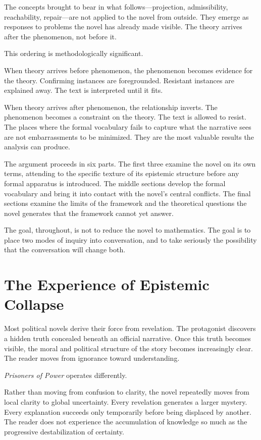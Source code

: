 \documentclass[12pt, a4paper]{article}
\theoremstyle{plain}
\theoremstyle{definition}
\theoremstyle{remark}
\begin{document}
The concepts brought to bear in what follows---projection,
admissibility, reachability, repair---are not applied
to the novel from outside. They emerge as responses to
problems the novel has already made visible. The theory
arrives after the phenomenon, not before it.

This ordering is methodologically significant.

When theory arrives before phenomenon, the phenomenon
becomes evidence for the theory. Confirming instances
are foregrounded. Resistant instances are explained away.
The text is interpreted until it fits.

When theory arrives after phenomenon, the relationship
inverts. The phenomenon becomes a constraint on the
theory. The text is allowed to resist. The places where
the formal vocabulary fails to capture what the narrative
sees are not embarrassments to be minimized. They are
the most valuable results the analysis can produce.

The argument proceeds in six parts. The first three
examine the novel on its own terms, attending to the
specific texture of its epistemic structure before
any formal apparatus is introduced. The middle sections
develop the formal vocabulary and bring it into contact
with the novel's central conflicts. The final sections
examine the limits of the framework and the theoretical
questions the novel generates that the framework cannot
yet answer.

The goal, throughout, is not to reduce the novel to
mathematics. The goal is to place two modes of inquiry
into conversation, and to take seriously the possibility
that the conversation will change both.

\section{The Experience of Epistemic Collapse}

Most political novels derive their force from revelation.
The protagonist discovers a hidden truth concealed beneath
an official narrative. Once this truth becomes visible,
the moral and political structure of the story becomes
increasingly clear. The reader moves from ignorance
toward understanding.

\textit{Prisoners of Power} operates differently.

Rather than moving from confusion to clarity, the novel
repeatedly moves from local clarity to global uncertainty.
Every revelation generates a larger mystery. Every
explanation succeeds only temporarily before being
displaced by another. The reader does not experience
the accumulation of knowledge so much as the progressive
destabilization of certainty.
\end{document}

